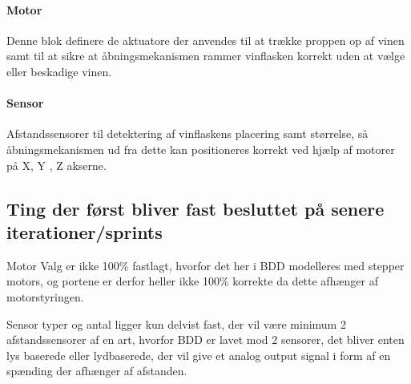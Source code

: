 \paragraph{Motor} Denne blok definere de aktuatore der anvendes til at trække proppen op af vinen samt til at sikre at åbningsmekanismen rammer vinflasken korrekt uden at vælge eller beskadige vinen.

\paragraph{Sensor} Afstandssensorer til detektering af vinflaskens placering samt størrelse, så åbningsmekanismen ud fra dette kan positioneres korrekt ved hjælp af motorer på X, Y , Z akserne.

\subsection{Ting der først bliver fast besluttet på senere iterationer/sprints}

Motor Valg er ikke 100\% fastlagt, hvorfor det her i BDD modelleres med stepper motors, og portene er derfor heller ikke 100\% korrekte da dette afhænger af motorstyringen.

Sensor typer og antal ligger kun delvist fast, der vil være minimum 2 afstandssensorer af en art, hvorfor BDD er lavet mod 2 sensorer, det bliver enten lys baserede eller lydbaserede, der vil give et analog output signal i form af en spænding der afhænger af afstanden.